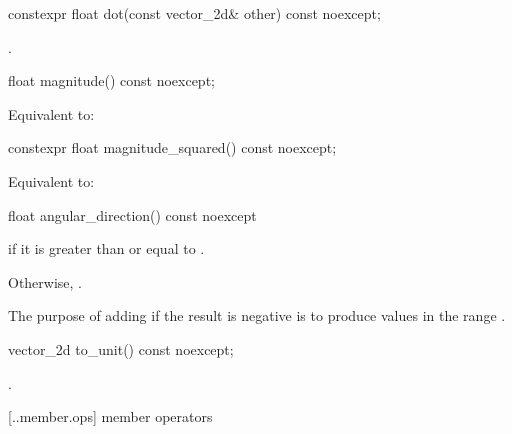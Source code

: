 %
\begin{itemdecl}
constexpr float dot(const vector_2d& other) const noexcept;
\end{itemdecl}
\begin{itemdescr}
\pnum
\returns
{}.
\end{itemdescr}

%
\begin{itemdecl}
float magnitude() const noexcept;
\end{itemdecl}
\begin{itemdescr}
\pnum
\returns
Equivalent to: 
\end{itemdescr}

%
\begin{itemdecl}
constexpr float magnitude_squared() const noexcept;
\end{itemdecl}
\begin{itemdescr}
\pnum
\returns
Equivalent to: 
\end{itemdescr}

%
\begin{itemdecl}
float angular_direction() const noexcept
\end{itemdecl}
\begin{itemdescr}
\pnum
\returns
{} if it is greater than or equal to .

\pnum
Otherwise, . 

\pnum
\begin{note}
The purpose of adding  if the result is negative is to produce values in the range .
\end{note}
\end{itemdescr}

%
\begin{itemdecl}
vector_2d to_unit() const noexcept;
\end{itemdecl}
\begin{itemdescr}
\pnum
\returns
{}.
\end{itemdescr}

 [\iotwod.\vectortwod.member.ops] { member operators}

